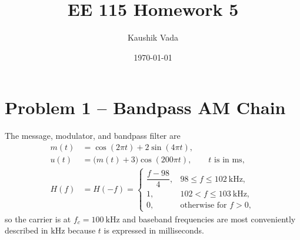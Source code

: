 \documentclass[11pt]{article}
\begin{document}
\title{EE 115 Homework 5}
\author{Kaushik Vada}
\date{\today}
\maketitle

\section*{Problem 1 -- Bandpass AM Chain}

The message, modulator, and bandpass filter are
\begin{align*}
  m(t) &= \cos(2\pi t) + 2\sin(4\pi t), \\
  u(t) &= \big(m(t) + 3\big)\cos(200\pi t), \qquad t \text{ is in ms},\\
  H(f) &= H(-f) =
  \begin{cases}
    \dfrac{f-98}{4}, & 98 \le f \le 102~\text{kHz},\\[4pt]
    1, & 102 < f \le 103~\text{kHz},\\
    0, & \text{otherwise for }f>0,
  \end{cases}
\end{align*}
so the carrier is at $f_c = 100~\text{kHz}$ and baseband frequencies are most conveniently described in $\text{kHz}$ because $t$ is expressed in milliseconds.
\end{document}
